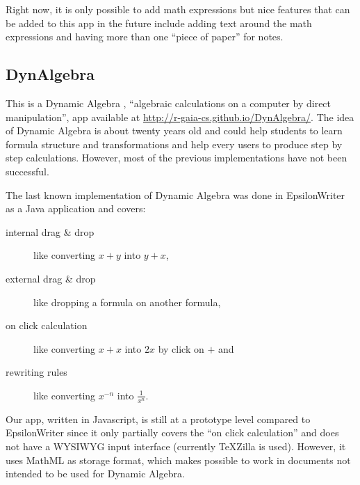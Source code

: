 Right now, it is only possible to add math expressions but nice features that can be
added to this app in the future include adding text around the math expressions and
having more than one ``piece of paper'' for notes.

\subsection{DynAlgebra}

This is a Dynamic Algebra \cite{Nicaud1}, ``algebraic calculations
on a computer by direct manipulation'', app available at
\href{http://r-gaia-cs.github.io/DynAlgebra/}{http://r-gaia-cs.github.io/DynAlgebra/}.
The idea of Dynamic Algebra is about twenty years old and could help
students to learn formula structure and transformations and help every users to
produce step by step calculations. However, most of the previous implementations
have not been successful.

The last known implementation of Dynamic Algebra was done in EpsilonWriter
\cite{Nicaud2} as a Java application and covers:
\begin{description}
  \item[internal drag \& drop] like converting $x + y$ into $y + x$,
  \item[external drag \& drop] like dropping a formula on another formula,
  \item[on click calculation] like converting $x + x$ into $2 x$ by click on $+$ and
  \item[rewriting rules] like converting $x^{-n}$ into $\frac{1}{x^n}$.
\end{description}

Our app, written in Javascript, is still at a prototype level compared
to EpsilonWriter since it only partially
covers the ``on click calculation'' and does not have a WYSIWYG input interface
(currently TeXZilla is used). However, it uses MathML as storage format,
which makes possible to work in documents not intended to be used for
Dynamic Algebra.
